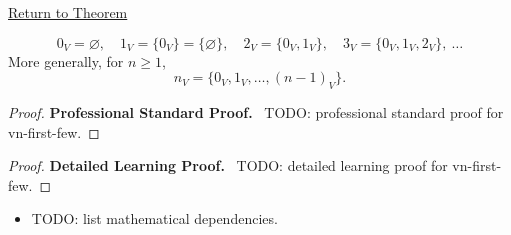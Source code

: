 \newpage
{}
\label{prf:vn-first-few}

\begin{remark*}[Return]
\hyperref[prop:vn-first-few]{Return to Theorem}
\end{remark*}

\begin{theorem*}
\[
0_V=\varnothing,\quad
1_V=\{0_V\}=\{\varnothing\},\quad
2_V=\{0_V,1_V\},\quad
3_V=\{0_V,1_V,2_V\},\ \dots
\]
More generally, for $n\ge 1$,
\[
n_V=\{0_V,1_V,\dots,(n-1)_V\}.
\]
\end{theorem*}

\begin{proof}
\textbf{Professional Standard Proof.}~
TODO: professional standard proof for vn-first-few.
\end{proof}

\begin{proof}
\textbf{Detailed Learning Proof.}~
TODO: detailed learning proof for vn-first-few.
\end{proof}

\begin{remark*}
\end{remark*}

\begin{dependencies}
\begin{itemize}
  \item TODO: list mathematical dependencies.
\end{itemize}
\end{dependencies}

\clearpage
